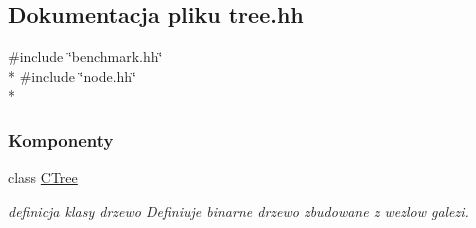 \hypertarget{tree_8hh}{}\subsection{Dokumentacja pliku tree.\+hh}
\label{tree_8hh}
{\ttfamily \#include \char`\"{}benchmark.\+hh\char`\"{}}\\*
{\ttfamily \#include \char`\"{}node.\+hh\char`\"{}}\\*
\subsubsection*{Komponenty}
\begin{DoxyCompactItemize}
\item 
class \hyperlink{class_c_tree}{C\+Tree}
\begin{DoxyCompactList}\small\item\em definicja klasy drzewo Definiuje binarne drzewo zbudowane z wezlow galezi. \end{DoxyCompactList}\end{DoxyCompactItemize}
